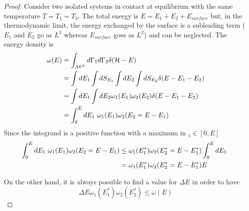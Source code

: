     \begin{proof}
        Consider two isolated systems in contact at equilibrium with the same temperature $T = T_1 = T_2$. The total energy is $E = E_1 + E_2 + E_{surface}$ but, in the thermodynamic limit, the energy exchanged by the surface is a subleading term ($E_1$ and $E_2$ go as $L^3$ whereas $E_{surface}$ goes as $L^2$) and can be neglected. The energy density is 
        \begin{equation*}
        \begin{aligned}
            \omega(E) & = \int_{\mathcal M^N} d\Gamma_1 d\Gamma_2 \delta(\mathcal H - E) \\ & = \int dE_1 \int dS_{E_1} \int dE_2 \int dS_{E_2} \delta (E - E_1 - E_2) \\ & = \int dE_1 \int dE_2 \omega_1(E_1) \omega_2(E_2) \delta (E - E_1 - E_2) \\ & = \int_{0}^{E}dE_1~ \omega_1(E_1) \omega_2(E_2 = E - E_1)
        \end{aligned}
        \end{equation*}
        Since the integrand is a positive function with a maximum in $_1 \in [0, E]$
        \begin{equation}\label{proof1}
        \begin{aligned}
            \int_{0}^{E}dE_1~ \omega_1(E_1) \omega_2(E_2 = E - E_1) & \leq \omega_1(E^*_1) \omega_2(E^*_2 = E - E^*_1) \int_{0}^{E}dE_1~ \\ & = \omega_1(E^*_1) \omega_2(E^*_2 = E - E^*_1) E
        \end{aligned}
        \end{equation}

        On the other hand, it is always possible to find a value for $\Delta E$ in order to have 
        \begin{equation} \label{proof2}
            \Delta E \omega_1(E^*_1) \omega_2(E^*_2) \leq \omega(E)
        \end{equation}


\end{proof}

